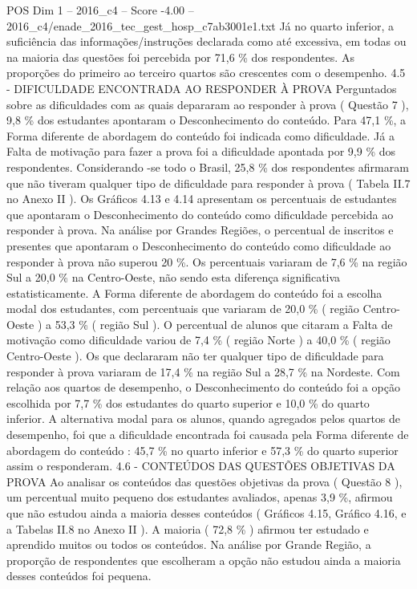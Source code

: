 \begin{textsample}{POS Dim 1 – 2016\_c4 – Score -4.00 – 2016\_c4/enade\_2016\_tec\_gest\_hosp\_c7ab3001e1.txt}
Já no quarto inferior, a suficiência das informações/instruções declarada como até excessiva, em todas ou na maioria das questões foi percebida por 71,6 \% dos respondentes.
As proporções do primeiro ao terceiro quartos são crescentes com o desempenho. 4.5 - DIFICULDADE ENCONTRADA AO RESPONDER À PROVA Perguntados sobre as dificuldades com as quais depararam ao responder à prova ( Questão 7 ), 9,8 \% dos estudantes apontaram o Desconhecimento do conteúdo.
Para 47,1 \%, a Forma diferente de abordagem do conteúdo foi indicada como dificuldade.
Já a Falta de motivação para fazer a prova foi a dificuldade apontada por 9,9 \% dos respondentes.
Considerando -se todo o Brasil, 25,8 \% dos respondentes afirmaram que não tiveram qualquer tipo de dificuldade para responder à prova ( Tabela II.7 no Anexo II ).
Os Gráficos 4.13 e 4.14 apresentam os percentuais de estudantes que apontaram o Desconhecimento do conteúdo como dificuldade percebida ao responder à prova.
Na análise por Grandes Regiões, o percentual de inscritos e presentes que apontaram o Desconhecimento do conteúdo como dificuldade ao responder à prova não superou 20 \%.
Os percentuais variaram de 7,6 \% na região Sul a 20,0 \% na Centro-Oeste, não sendo esta diferença significativa estatisticamente.
A Forma diferente de abordagem do conteúdo foi a escolha modal dos estudantes, com percentuais que variaram de 20,0 \% ( região Centro-Oeste ) a 53,3 \% ( região Sul ).
O percentual de alunos que citaram a Falta de motivação como dificuldade variou de 7,4 \% ( região Norte ) a 40,0 \% ( região Centro-Oeste ).
Os que declararam não ter qualquer tipo de dificuldade para responder à prova variaram de 17,4 \% na região Sul a 28,7 \% na Nordeste.
Com relação aos quartos de desempenho, o Desconhecimento do conteúdo foi a opção escolhida por 7,7 \% dos estudantes do quarto superior e 10,0 \% do quarto inferior.
A alternativa modal para os alunos, quando agregados pelos quartos de desempenho, foi que a dificuldade encontrada foi causada pela Forma diferente de abordagem do conteúdo : 45,7 \% no quarto inferior e 57,3 \% do quarto superior assim o responderam. 4.6 - CONTEÚDOS DAS QUESTÕES OBJETIVAS DA PROVA Ao analisar os conteúdos das questões objetivas da prova ( Questão 8 ), um percentual muito pequeno dos estudantes avaliados, apenas 3,9 \%, afirmou que não estudou ainda a maioria desses conteúdos ( Gráficos 4.15, Gráfico 4.16, e a Tabelas II.8 no Anexo II ).
A maioria ( 72,8 \% ) afirmou ter estudado e aprendido muitos ou todos os conteúdos.
Na análise por Grande Região, a proporção de respondentes que escolheram a opção não estudou ainda a maioria desses conteúdos foi pequena.

\end{textsample}
